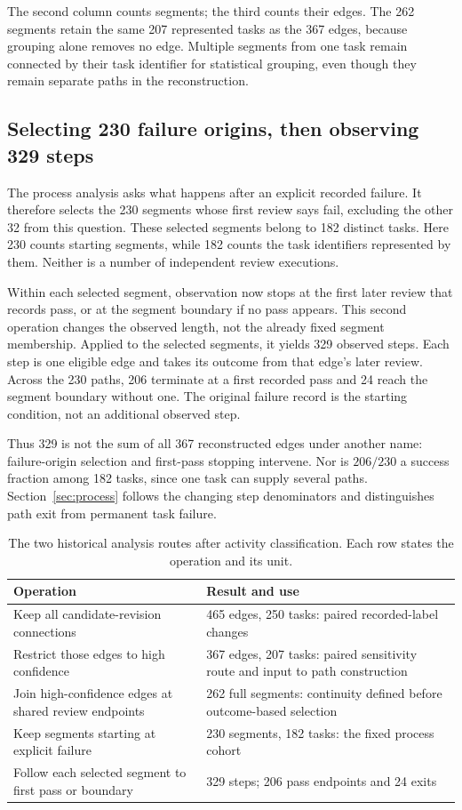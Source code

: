 The second column counts segments; the third counts their edges. The 262 segments retain the same 207 represented tasks as the 367 edges, because grouping alone removes no edge. Multiple segments from one task remain connected by their task identifier for statistical grouping, even though they remain separate paths in the reconstruction.

\subsection{Selecting 230 failure origins, then observing 329 steps}
\label{subsec:failure-cohort}
The process analysis asks what happens after an explicit recorded failure. It therefore selects the 230 segments whose first review says fail, excluding the other 32 from this question. These selected segments belong to 182 distinct tasks. Here 230 counts starting segments, while 182 counts the task identifiers represented by them. Neither is a number of independent review executions.

Within each selected segment, observation now stops at the first later review that records pass, or at the segment boundary if no pass appears. This second operation changes the observed length, not the already fixed segment membership. Applied to the selected segments, it yields 329 observed steps. Each step is one eligible edge and takes its outcome from that edge's later review. Across the 230 paths, 206 terminate at a first recorded pass and 24 reach the segment boundary without one. The original failure record is the starting condition, not an additional observed step.

Thus 329 is not the sum of all 367 reconstructed edges under another name: failure-origin selection and first-pass stopping intervene. Nor is $206/230$ a success fraction among 182 tasks, since one task can supply several paths. Section~\ref{sec:process} follows the changing step denominators and distinguishes path exit from permanent task failure.

\begin{table}[htbp]
\centering\small
\caption{The two historical analysis routes after activity classification. Each row states the operation and its unit.}
\label{tab:units}
\begin{tabularx}{\linewidth}{Y Y}
\toprule
Operation & Result and use \\
\midrule
Keep all candidate-revision connections & 465 edges, 250 tasks: paired recorded-label changes \\
Restrict those edges to high confidence & 367 edges, 207 tasks: paired sensitivity route and input to path construction \\
Join high-confidence edges at shared review endpoints & 262 full segments: continuity defined before outcome-based selection \\
Keep segments starting at explicit failure & 230 segments, 182 tasks: the fixed process cohort \\
Follow each selected segment to first pass or boundary & 329 steps; 206 pass endpoints and 24 exits \\
\bottomrule
\end{tabularx}
\end{table}


